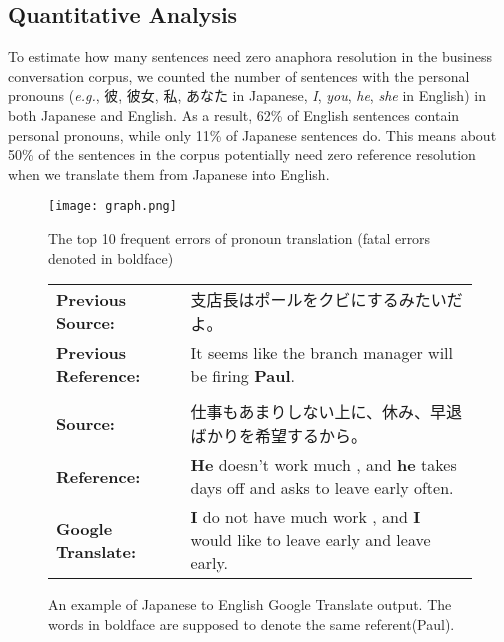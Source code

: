 \documentclass[11pt,a4paper]{article}
\begin{document}
\subsection{Quantitative Analysis}
\label{sec:quantitative-anaphora}

\begin{CJK}{UTF8}{min}
To estimate how many sentences need zero anaphora resolution in the business conversation corpus, we counted the number of sentences with the personal pronouns ({\it e.g.}, 彼, 彼女, 私, あなた in Japanese, {\it I}, {\it you}, {\it he}, {\it she} in English) in both Japanese and English. As a result, 62\% of English sentences contain personal pronouns, while only 11\% of Japanese sentences do. This means about 50\% of the sentences in the corpus potentially need zero reference resolution when we translate them from Japanese into English.
\end{CJK}

\begin{figure}[t]
    \centering
    \texttt{[image: graph.png]}
    \caption{The top 10 frequent errors of pronoun translation (fatal errors denoted in boldface)}
    \label{fig:error-graph}
\end{figure}

\begin{CJK}{UTF8}{min}
\begin{figure*}[t]
\begin{small}
  \begin{tabular}{lp{12cm}}
   \bf Previous Source: & 支店長はポールをクビにするみたいだよ。 \\
   \bf Previous Reference: & It seems like the branch manager will be firing {\bf Paul}. \\\\


   \bf Source: & 仕事もあまりしない上に、休み、早退ばかりを希望するから。 \\
   \bf Reference: & {\bf He} doesn't work much , and {\bf he} takes days off and asks to leave early often. \\
   \bf Google Translate: & {\bf I} do not have much work , and {\bf I} would like to leave early and leave early.\\

  \end{tabular}
  \caption{An example of Japanese to English Google Translate output. The words in boldface are supposed to denote the same referent(Paul).}

  \label{fig:google-error-example1}
  \end{small}
\end{figure*}
\end{CJK}
\end{document}
